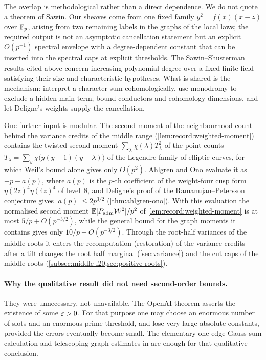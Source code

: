 The overlap is methodological rather than a direct dependence. We do
not quote a theorem of Sawin. Our sheaves come from one fixed family
$y^2=f(x)(x-z)$ over $\mathbb F_p$, arising from two remaining labels in the
graphs of the local laws; the required output is not an asymptotic
cancellation statement but an explicit $O(p^{-1})$ spectral envelope
with a degree-dependent constant that can be inserted into the spectral
caps at explicit thresholds. The Sawin--Shusterman results cited above
concern increasing polynomial degree over a fixed finite field satisfying
their size and characteristic hypotheses. What is shared is the
mechanism: interpret a character sum cohomologically, use monodromy
to exclude a hidden main term, bound conductors and cohomology
dimensions, and let Deligne's weights supply the cancellation.

One further input is modular. The second moment of the neighbourhood
count behind the variance credits of the middle range
(\cref{lem:record:weighted-moment}) contains the twisted second moment
$\sum_\lambda\chi(\lambda)T_\lambda^2$ of the point counts
$T_\lambda=\sum_y\chi\bigl(y(y-1)(y-\lambda)\bigr)$ of the Legendre family
of elliptic curves, for which Weil's bound alone gives only $O(p^2)$.
Ahlgren and Ono \cite{AhlgrenOno2000} evaluate it as $-p-a(p)$, where
$a(p)$ is the $p$-th coefficient of the weight-four cusp form
$\eta(2z)^4\eta(4z)^4$ of level~$8$, and Deligne's proof of the
Ramanujan--Petersson conjecture \cite{DeligneWeilI} gives
$|a(p)|\le2p^{3/2}$ (\cref{thm:ahlgren-ono}). With this evaluation the normalised second moment
$\mathbb E[P_{\rm adm}\mathcal W^2]/p^2$ of
\cref{lem:record:weighted-moment} is at most $5/p+O(p^{-3/2})$,
while the general bound for the graph moments it contains gives
only $10/p+O(p^{-3/2})$. Through the root-half variances of the
middle roots it enters the recomputation (restoration) of the
variance credits after a tilt changes the root half marginal
(\cref{sec:variance}) and the cut caps of the middle roots
(\cref{subsec:middle-l20,sec:positive-roots}).

\paragraph{Why the qualitative result did not need second-order bounds.}
They were unnecessary, not unavailable. The OpenAI theorem asserts the
existence of some $\varepsilon>0$. For that purpose one may choose an enormous
number of slots and an enormous prime threshold, and lose very large
absolute constants, provided the errors eventually become small. The
elementary one-edge Gauss-sum calculation and telescoping graph
estimates in \cite[Section~2]{OpenAI} are enough for that qualitative
conclusion.

